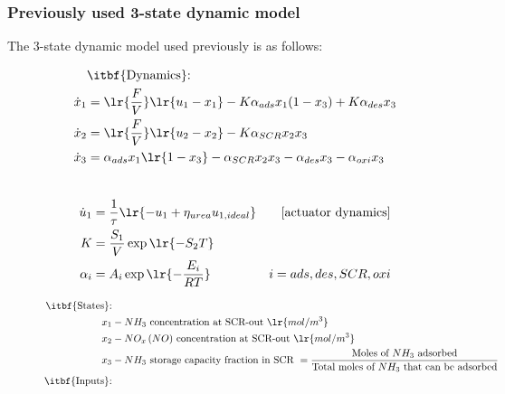 \subsubsection{Previously used 3-state dynamic model}
The 3-state dynamic model used previously \cite{jain2023diagnostics} is as follows:
\begin{figure}[H]
    \begin{minipage}{0.59\textwidth}
        \begin{align*}
        &\text{\itbf{Dynamics}:}\\
            \dot x_1 &= \lr{\frac{F}{V}} \lr{u_1 - x_1} - K \alpha_{ads} x_1 (1 - x_3) + K \alpha_{des} x_3\\
            \dot x_2 &= \lr{\frac{F}{V}} \lr{u_2 - x_2} - K \alpha_{SCR} x_2 x_3\\
            \dot x_3 &= \alpha_{ads} x_1 \lr{ 1 - x_3} - \alpha_{SCR} x_2 x_3 - \alpha_{des} x_3 - \alpha_{oxi} x_3
        \end{align*}
    \end{minipage}
    \begin{minipage}{0.4\textwidth}
        \begin{align*}
            &\\
            \dot u_1 &= \frac{1}{\tau} \lr{ -u_1 +\eta_{urea} u_{1, ideal}} & [\text{actuator dynamics}]\\
            K &= \frac{S_1}{V} \exp\lr{-S_2 T}\\
            \alpha_i &= A_i \exp\lr{-\frac{E_i}{RT}}
            & i = ads, des, SCR, oxi
        \end{align*}
    \end{minipage}
    \begin{minipage}{\textwidth}
        \begin{align*}
            \text{\itbf{States}:}&\\
            x_1 &- NH_3 \text{ concentration at SCR-out } \lr{mol/m^3}\\
            x_2 &- NO_x \, (NO) \text{ concentration at SCR-out } \lr{mol/m^3}\\
            x_3 &- NH_3 \text{ storage capacity fraction in SCR } = \frac{\text{Moles of $NH_3$ adsorbed}}{\text{Total moles of $NH_3$ that can be adsorbed}}\\
            \text{\itbf{Inputs}:}&\\

\end{align*}
\end{minipage}
\end{figure}
